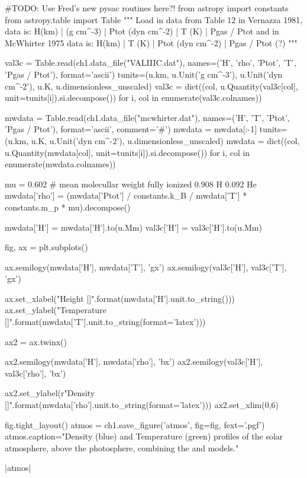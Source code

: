 \begin{pycode}[chapter1]
#TODO: Use Fred's new pysac routines here?!
from astropy import constants
from astropy.table import Table
"""
Load in data from Table 12 in Vernazza 1981,
data is:
    H(km) | \rho (g cm^-3) | Ptot (dyn cm^-2) | T (K) | Pgas / Ptot
and in McWhirter 1975 data is:
    H(km) | T (K)          | Ptot (dyn cm^-2) | Pgas / Ptot (?)
"""

val3c = Table.read(ch1.data_file("VALIIIC.dat"),
				  names=('H', 'rho', 'Ptot', 'T', 'Pgas / Ptot'),
				  format='ascii')
tunits=(u.km, u.Unit('g cm^-3'), u.Unit('dyn cm^-2'), u.K, u.dimensionless_unscaled)
val3c = dict((col, u.Quantity(val3c[col], unit=tunits[i]).si.decompose()) for i, col in enumerate(val3c.colnames))

mwdata = Table.read(ch1.data_file("mcwhirter.dat"),
				  names=('H', 'T', 'Ptot', 'Pgas / Ptot'),
				  format='ascii', comment='#')
mwdata = mwdata[:-1]
tunits=(u.km, u.K, u.Unit('dyn cm^-2'), u.dimensionless_unscaled)
mwdata = dict((col, u.Quantity(mwdata[col], unit=tunits[i]).si.decompose()) for i, col in enumerate(mwdata.colnames))

mu = 0.602  # mean molecullar weight fully ionized 0.908 H 0.092 He
mwdata['rho'] = (mwdata['Ptot'] / constants.k_B / mwdata['T'] * constants.m_p * mu).decompose()

mwdata['H'] = mwdata['H'].to(u.Mm)
val3c['H'] = val3c['H'].to(u.Mm)

fig, ax = plt.subplots()

ax.semilogy(mwdata['H'], mwdata['T'], 'gx')
ax.semilogy(val3c['H'], val3c['T'], 'gx')

ax.set_xlabel("Height [{}]".format(mwdata['H'].unit.to_string()))
ax.set_ylabel("Temperature [{}]".format(mwdata['T'].unit.to_string(format='latex')))

ax2 = ax.twinx()

ax2.semilogy(mwdata['H'], mwdata['rho'], 'bx')
ax2.semilogy(val3c['H'], val3c['rho'], 'bx')

ax2.set_ylabel(r"Density [{}]".format(mwdata['rho'].unit.to_string(format='latex')))
ax2.set_xlim(0,6)

fig.tight_layout()
atmos = ch1.save_figure('atmos', fig=fig, fext='.pgf')
atmos.caption="Density (blue) and Temperature (green) profiles of the solar atmosphere, above the photosphere, combining the \cite{mcwhirter1975} and \cite{vernazza1981} models."
\end{pycode}

\py[chapter1]|atmos|


